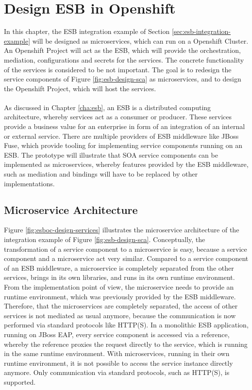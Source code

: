 \chapter{Design ESB in Openshift}
\label{cha:esboc}
In this chapter, the ESB integration example of Section \vref{sec:esb-integration-example} will be designed as microservices, which can run on a Openshift Cluster. An Openshift Project will act as the ESB, which will provide the orchestration, mediation, configurations and secrets for the services. The concrete functionality of the services is considered to be not important. The goal is to redesign the service components of Figure \vref{fig:esb-design-sca} as microservices, and to design the Openshift Project, which will host the services.
\\ \\
As discussed in Chapter \vref{cha:esb}, an ESB is a distributed computing architecture, whereby services act as a consumer or producer. These services provide a business value for an enterprise in form of an integration of an internal or external service. There are multiple providers of ESB middleware like JBoss Fuse, which provide tooling for implementing service components running on an ESB. The prototype will illustrate that SOA service components can be implemented as microservices, whereby features provided by the ESB middleware, such as mediation and bindings will have to be replaced by other implementations.

\section{Microservice Architecture}
Figure \vref{fig:esboc-design-services} illustrates the microservice architecture of the integration example of Figure \vref{fig:esb-design-sca}. Conceptually, the transformation of a service component to a microservice is easy, because a service component and a microservice act very similar. Compared to a service component of an ESB middleware, a microservice is completely separated from the other services, brings in its own libraries, and runs in its own runtime environment. From the implementation point of view, the microservice needs to provide an runtime environment, which was previously provided by the ESB middleware. Therefore, that the microservices are completely separated, the access of other services is not mediated as usual anymore, because the communication is now performed via standard protocols like HTTP(S). In a monolithic ESB application, running on JBoss EAP, every service component is accessed via a reference, whereby the reference proxies the request directly to the service, which is running in the same runtime environment. With microservices, running in their own runtime environment, it is not possible to access the service instance directly anymore. Only communication via standard protocols, such as HTTP(S), is supported.

